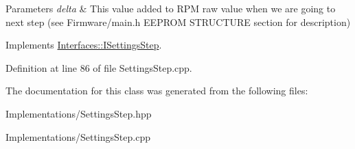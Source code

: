 \begin{DoxyParams}{Parameters}
{\em delta} & This value added to R\+PM raw value when we are going to next step (see Firmware/main.\+h E\+E\+P\+R\+OM S\+T\+R\+U\+C\+T\+U\+RE section for description) \\
\hline
\end{DoxyParams}


Implements \hyperlink{class_interfaces_1_1_i_settings_step_a62997701dc6ad91ec0a9d699ef99463e}{Interfaces\+::\+I\+Settings\+Step}.



Definition at line 86 of file Settings\+Step.\+cpp.



The documentation for this class was generated from the following files\+:\begin{DoxyCompactItemize}
\item 
Implementations/Settings\+Step.\+hpp\item 
Implementations/Settings\+Step.\+cpp\end{DoxyCompactItemize}
